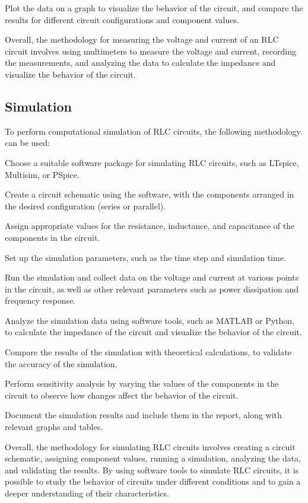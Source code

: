 \documentclass[12pt,twoside]{extarticle}
\begin{document}
Plot the data on a graph to visualize the behavior of the circuit, and compare the results for different circuit configurations and component values.

Overall, the methodology for measuring the voltage and current of an RLC circuit involves using multimeters to measure the voltage and current, recording the measurements, and analyzing the data to calculate the impedance and visualize the behavior of the circuit.

\subsection{Simulation}
To perform computational simulation of RLC circuits, the following methodology can be used:

Choose a suitable software package for simulating RLC circuits, such as LTspice, Multisim, or PSpice.

Create a circuit schematic using the software, with the components arranged in the desired configuration (series or parallel).

Assign appropriate values for the resistance, inductance, and capacitance of the components in the circuit.

Set up the simulation parameters, such as the time step and simulation time.

Run the simulation and collect data on the voltage and current at various points in the circuit, as well as other relevant parameters such as power dissipation and frequency response.

Analyze the simulation data using software tools, such as MATLAB or Python, to calculate the impedance of the circuit and visualize the behavior of the circuit.

Compare the results of the simulation with theoretical calculations, to validate the accuracy of the simulation.

Perform sensitivity analysis by varying the values of the components in the circuit to observe how changes affect the behavior of the circuit.

Document the simulation results and include them in the report, along with relevant graphs and tables.

Overall, the methodology for simulating RLC circuits involves creating a circuit schematic, assigning component values, running a simulation, analyzing the data, and validating the results. By using software tools to simulate RLC circuits, it is possible to study the behavior of circuits under different conditions and to gain a deeper understanding of their characteristics.
\end{document}
